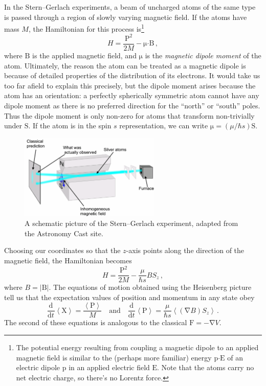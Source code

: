 \documentclass{article}
\theoremstyle{plain}\theoremheaderfont{\normalfont\itshape}\theorembodyfont{\rmfamily}\theoremseparator{.}\newtheorem*{rem}{Remark}\newtheorem*{ex}{Example}\newtheorem*{proof}{Proof}\newtheorem*{altp}{Alternative proof}
\theoremstyle{plain}\theoremheaderfont{\normalfont\bfseries}\theorembodyfont{\rmfamily}\theoremseparator{.}\newtheorem{thm}{Theorem}[section]\newtheorem{lem}[thm]{Lemma}\newtheorem{prop}[thm]{Proposition}\newtheorem*{cor}{Corollary}\newtheorem{defn}[thm]{Definition}\newtheorem{clm}[thm]{Claim}\newtheorem{clminproof}{Claim}
\theoremstyle{break}\theoremheaderfont{\normalfont\itshape}\theorembodyfont{\rmfamily}\theoremseparator{.\medskip}\newtheorem*{proofskip}{Proof}\newtheorem*{exs}{Examples}\newtheorem*{rems}{Remarks}
\theoremstyle{break}\theoremheaderfont{\normalfont\bfseries}\theorembodyfont{\rmfamily}\theoremseparator{.\medskip}\newtheorem{lemskip}[thm]{Lemma}\newtheorem{defnskip}[thm]{Definition}\newtheorem{propskip}[thm]{Proposition}\newtheorem{thmskip}[thm]{Theorem}
\numberwithin{equation}{section}
\newcommand{\dv}[3][]{\frac{\mathrm{d}^{#1} #2}{{\mathrm{d} #3}^{#1}}}
\newcommand{\eval}[1]{\left\langle #1 \right\rangle}
\newcommand{\vb}[1]{\bm{\mathrm{#1}}}
\newcommand{\vdot}{\bm{\cdot}}
\newcommand{\abs}[1]{\left| #1 \right|}
\newcommand{\grad}{\vb{\nabla}}
\begin{document}
    In the Stern--Gerlach experiments, a beam of uncharged atoms of the same type is passed through a region of slowly varying magnetic field. If the atoms have mass \(M\), the Hamiltonian for this process is\footnote{The potential energy resulting from coupling a magnetic dipole to an applied magnetic field is similar to the (perhaps more familiar) energy \(\vb{p}\vdot\vb{E}\) of an electric dipole \(\vb{p}\) in an applied electric field \(\vb{E}\). Note that the atoms carry no net electric charge, so there's no Lorentz force.}
    \begin{equation}
        H=\frac{\vb{P}^2}{2M}-\vb{\mu}\vdot\vb{B}\,,
    \end{equation}
    where \(\vb{B}\) is the applied magnetic field, and \(\vb{\mu}\) is the \textit{magnetic dipole moment} of the atom. Ultimately, the reason the atom can be treated as a magnetic dipole is because of detailed properties of the distribution of its electrons. It would take us too far afield to explain this precisely, but the dipole moment arises because the atom has an orientation: a perfectly spherically symmetric atom cannot have any dipole moment as there is no preferred direction for the ``north'' or ``south'' poles. Thus the dipole moment is only non-zero for atoms that transform non-trivially under \(\vb{S}\). If the atom is in the spin \(s\) representation, we can write \(\vb{\mu}=(\mu/\hbar s)\vb{S}\).

    \begin{figure}
        \centering
        \includegraphics[width=0.6\textwidth]{Stern-Gerlach.png}
        \caption{A schematic picture of the Stern--Gerlach experiment, adapted from the Astronomy Cast site.}
    \end{figure}

    Choosing our coordinates so that the \(z\)-axis points along the direction of the magnetic field, the Hamiltonian becomes
    \begin{equation}
        H=\frac{\vb{P}^2}{2M}-\frac{\mu}{\hbar s}BS_z\,,
    \end{equation}
    where \(B=\abs{\vb{B}}\). The equations of motion obtained using the Heisenberg picture tell us that the expectation values of position and momentum in any state obey
    \begin{equation}
        \dv{}{t}\eval{\vb{X}}=\frac{\eval{\vb{P}}}{M}\quad\text{and}\quad\dv{}{t}\eval{\vb{P}}=\frac{\mu}{\hbar s}\eval{(\grad B)S_z}\,.
    \end{equation}
    The second of these equations is analogous to the classical \(\vb{F}=-\grad V\).
\end{document}
